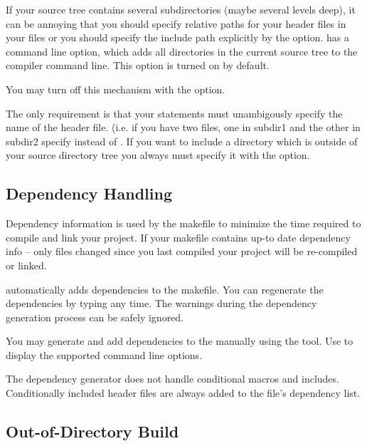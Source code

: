 If your source tree contains several subdirectories (maybe several levels
deep), it can be annoying that you should specify relative paths for your
header files in your  files or you should specify the include path
explicitly by the  option.  has a
command line option, which adds all directories in the current source tree
to the compiler command line. This option is turned on by default.

\begin{note}
You may turn off this mechanism with the  option.
\end{note}

The only requirement is that your  statements must unambigously
specify the name of the header file. (i.e. if you have two 
files, one in subdir1 and the other in subdir2 specify  instead of . If you want to
include a directory which is outside of your source directory tree you
always must specify it with the  option.


\subsection{Dependency Handling}

Dependency information is used by the makefile to minimize the time required to
compile and link your project. If your makefile contains up-to date dependency info
-- only files changed since you last compiled your project will be re-compiled or linked.


 automatically adds dependencies to the makefile.
You can regenerate the dependencies by typing  any time.
The warnings during the dependency generation process can be safely ignored.


You may generate and add dependencies to the  manually using the 
tool. Use  to display the supported command line options.

\begin{note}
The dependency generator does not handle conditional macros and includes. Conditionally included header
files are always added to the file's dependency list.
\end{note}


\subsection{Out-of-Directory Build}

